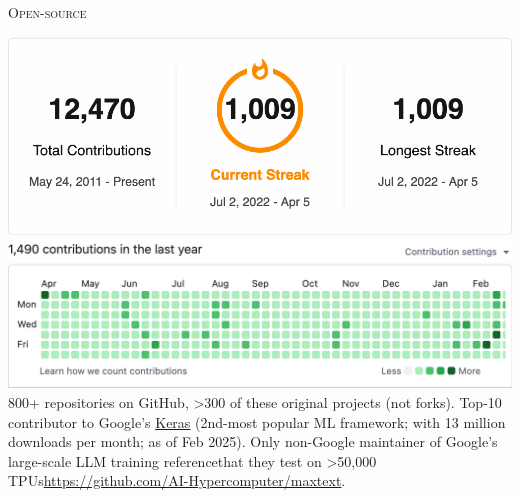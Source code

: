 \documentclass[11pt, a4paper]{article}
\newcommand{\headright}[1]{\vspace*{2.5ex}\textsc{\Large\color{cvblue}#1}\par%
     \vspace*{-2ex}{\color{cvblue}\hrulefill}\par}
\begin{document}
\begin{minipage}[t]{0.56\textwidth}
\headright{Open-source}
\includegraphics[width=1.101\columnwidth]{images/github0.png}
\includegraphics[width=1.101\columnwidth]{images/github1.png}
800+ repositories on GitHub, >300 of these original projects (not forks). Top-10 contributor to Google's \href{https://keras.io}{Keras} (2nd-most popular ML framework; with 13 million downloads per month; as of Feb 2025). Only non-Google maintainer of Google's large-scale LLM training reference\textemdash{}that they test on >50,000 TPUs\textemdash{}\href{https://github.com/AI-Hypercomputer/maxtext}{https://github.com/AI-Hypercomputer/maxtext}.
\end{minipage}
\end{document}

